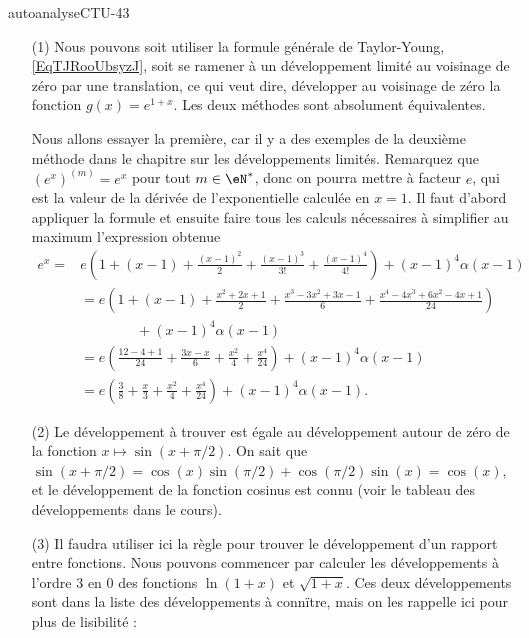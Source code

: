 
\begin{corrige}{autoanalyseCTU-43}

  \begin{enumerate}
  \item[(1)] Nous pouvons soit utiliser la formule générale de Taylor-Young, \eqref{EqTJRooUbsyzJ}, soit se ramener à un développement limité au voisinage de zéro par une translation, ce qui veut dire, développer  au voisinage de zéro la fonction $g(x) = e^{1+x}$. Les deux méthodes sont absolument équivalentes.  

Nous allons essayer la première, car il y a des exemples de la deuxième méthode dans le chapitre sur les développements limités. Remarquez que $(e^x)^{(m)} = e^x$ pour tout $m\in\eN^*$, donc on pourra mettre à facteur $e$, qui est la valeur de la dérivée de l'exponentielle calculée en $x=1$. Il faut d'abord appliquer la formule et ensuite faire tous les calculs nécessaires à simplifier au maximum l'expression obtenue 
\begin{equation*}
  \begin{aligned}
    e^{x} = & e\left(1+(x-1) + \frac{(x-1)^2}{2} + \frac{(x-1)^3}{3!} + \frac{(x-1)^4}{4!} \right)  + (x-1)^4\alpha(x-1) \\
    &  =e\left(1+(x-1) + \frac{x^2+2x+1}{2} + \frac{x^3-3x^2 +3x-1}{6} + \frac{x^4-4x^3+6x^2-4x+1}{24} \right) \\
    &\qquad\qquad + (x-1)^4\alpha(x-1) \\
    &  =e\left( \frac{12-4+1}{24} + \frac{3x-x}{6} + \frac{x^2}{4} + \frac{x^4}{24}\right)  + (x-1)^4\alpha(x-1) \\
    &  =e\left( \frac{3}{8} + \frac{x}{3} + \frac{x^2}{4} + \frac{x^4}{24}\right)  + (x-1)^4\alpha(x-1) .
  \end{aligned}
\end{equation*}
 \item[(2)] Le développement à trouver est égale au développement autour de zéro de la fonction $x\mapsto \sin(x+\pi/2)$. On sait que $\sin(x+\pi/2) = \cos(x)\sin(\pi/2) + \cos(\pi/2)\sin(x) = \cos(x)$, et le développement de la fonction cosinus est connu (voir le tableau des développements dans le cours).
  \item[(3)] Il faudra utiliser ici la règle pour trouver le développement d'un rapport entre fonctions. Nous pouvons commencer par calculer les développements à l'ordre 3 en 0 des fonctions $\ln(1+x)$ et $\sqrt{1+x}$. Ces deux développements sont dans la liste des développements à conn\"{i}tre, mais on les rappelle ici pour plus de lisibilité :

\end{enumerate}
\end{corrige}
